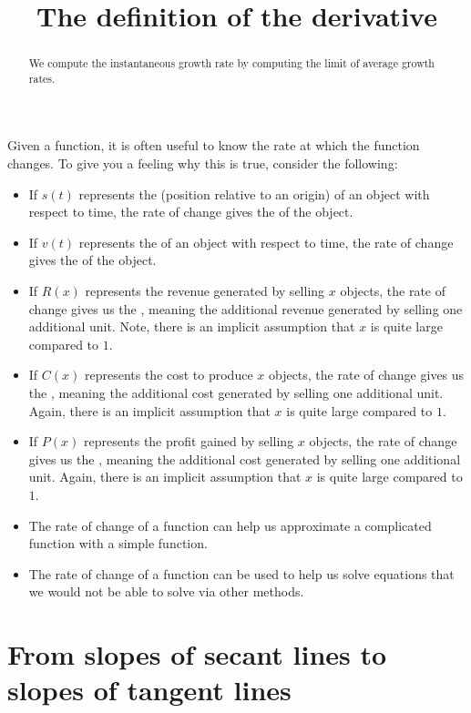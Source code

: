 \documentclass{ximera}
\title[Dig-In:]{The definition of the derivative}
\begin{document}
\begin{abstract}
We compute the instantaneous growth rate by computing the limit of
average growth rates.
\end{abstract}
\maketitle


Given a function, it is often useful to know the rate at which the
function changes. To give you a feeling why this is true, consider the
following:
\begin{itemize}
\item If $s(t)$ represents the  (position relative to an
  origin) of an object with respect to time, the rate of change gives
  the  of the object.
\item If $v(t)$ represents the  of an object with respect to
  time, the rate of change gives the  of the object.
\item If $R(x)$ represents the revenue generated by selling $x$
  objects, the rate of change gives us the ,
  meaning the additional revenue generated by selling one additional
  unit. Note, there is an implicit assumption that $x$ is quite large
  compared to $1$.
\item If $C(x)$ represents the cost to produce $x$ objects, the rate
  of change gives us the , meaning the
  additional cost generated by selling one additional unit. Again,
  there is an implicit assumption that $x$ is quite large compared to
  $1$.
\item If $P(x)$ represents the profit gained by selling $x$ objects,
  the rate of change gives us the , meaning
  the additional cost generated by selling one additional unit. Again,
  there is an implicit assumption that $x$ is quite large compared to
  $1$.
\item The rate of change of a function can help us approximate a
  complicated function with a simple function.
\item The rate of change of a function can be used to help us solve
  equations that we would not be able to solve via other methods.
\end{itemize}



\section{From slopes of secant lines to slopes of tangent lines}
\end{document}
